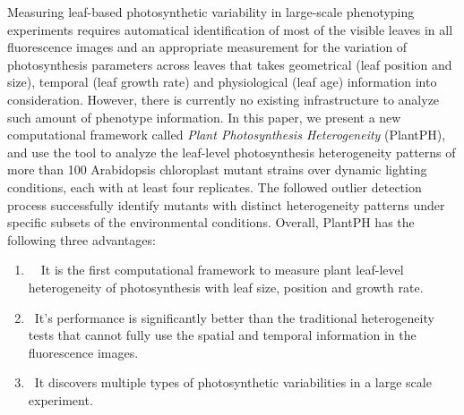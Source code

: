\documentclass{bioinfo}
\begin{document}
Measuring leaf-based photosynthetic variability in large-scale phenotyping experiments requires automatical identification of most of the visible leaves in all fluorescence images and an appropriate measurement for the variation of photosynthesis parameters across leaves that takes geometrical (leaf position and size), temporal (leaf growth rate) and physiological (leaf age) information into consideration. However, there is currently no existing infrastructure to analyze such amount of phenotype information. %
%
In this paper, we present a new computational framework called {\it Plant Photosynthesis Heterogeneity} (PlantPH), and use the tool to analyze the leaf-level photosynthesis heterogeneity patterns of more than 100 Arabidopsis chloroplast mutant strains over dynamic lighting conditions, each with at least four replicates. The followed outlier detection process successfully identify mutants with distinct heterogeneity patterns under specific subsets of the environmental conditions.
%
Overall, PlantPH has the following three advantages: %
\begin{enumerate}\vspace{-0.1in}
  \item~~It is the first computational framework to measure plant leaf-level heterogeneity of photosynthesis with leaf size, position and growth rate.
  \item~It's performance is significantly better than the traditional heterogeneity tests that cannot fully use the spatial and temporal information in the fluorescence images.
  \item~It discovers multiple types of photosynthetic variabilities in a large scale experiment.
\end{enumerate}

%
%
%


\vspace{-0.2in}
\end{document}
